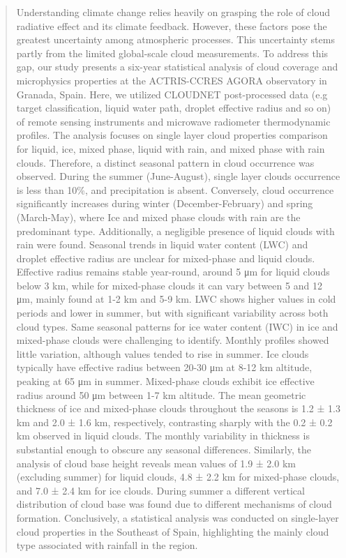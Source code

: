 \documentclass[journal abbreviation, manuscript]{copernicus}
\begin{document}
\begin{abstract}

Understanding climate change relies heavily on grasping the role of cloud radiative effect and its climate feedback. However, these factors pose the greatest uncertainty among atmospheric processes. This uncertainty stems partly from the limited global-scale cloud measurements. To address this gap, our study presents a six-year statistical analysis of cloud coverage and microphysics properties at the ACTRIS-CCRES AGORA observatory in Granada, Spain. Here, we utilized CLOUDNET post-processed data (e.g target classification, liquid water path, droplet effective radius and so on) of remote sensing instruments and microwave radiometer thermodynamic profiles. The analysis focuses on single layer cloud properties comparison for liquid, ice, mixed phase, liquid with rain, and mixed phase with rain clouds. Therefore, a distinct seasonal pattern in cloud occurrence was observed. During the summer (June-August), single layer clouds occurrence is less than 10\%, and precipitation is absent. Conversely, cloud occurrence significantly increases during winter (December-February) and spring (March-May), where Ice and mixed phase clouds with rain are the predominant type. Additionally, a negligible presence of liquid clouds with rain were found. Seasonal trends in liquid water content (LWC) and droplet effective radius are unclear for mixed-phase and liquid clouds. Effective radius remains stable year-round, around 5 μm for liquid clouds below 3 km, while for mixed-phase clouds it can vary between 5 and 12 μm, mainly found at 1-2 km and 5-9 km. LWC shows higher values in cold periods and lower in summer, but with significant variability across both cloud types. Same seasonal patterns for ice water content (IWC) in ice and mixed-phase clouds were challenging to identify. Monthly profiles showed little variation, although values tended to rise in summer. Ice clouds typically have effective radius between 20-30 μm at 8-12 km altitude, peaking at 65 μm in summer. Mixed-phase clouds exhibit ice effective radius around 50 μm between 1-7 km altitude. The mean geometric thickness of ice and mixed-phase clouds throughout the seasons is 1.2 ± 1.3 km and 2.0 ± 1.6 km, respectively, contrasting sharply with the 0.2 ± 0.2 km observed in liquid clouds. The monthly variability in thickness is substantial enough to obscure any seasonal differences. Similarly, the analysis of cloud base height reveals mean values of 1.9 ± 2.0 km (excluding summer) for liquid clouds, 4.8 ± 2.2 km for mixed-phase clouds, and 7.0 ± 2.4 km for ice clouds. During summer a different vertical distribution of cloud base was found due to different mechanisms of cloud formation. Conclusively, a statistical analysis was conducted on single-layer cloud properties in the Southeast of Spain, highlighting the mainly cloud type associated with rainfall in the region.

\end{abstract}
\end{document}

